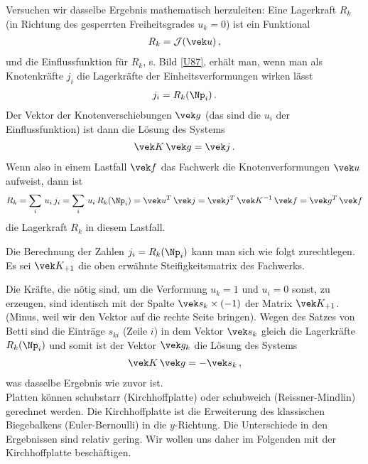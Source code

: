 {%
Versuchen wir dasselbe Ergebnis mathematisch herzuleiten: Eine Lagerkraft $R_k$ (in Richtung des gesperrten Freiheitsgrades $u_k = 0$) ist ein Funktional
\begin{align}
R_k = \mathcal{J}(\vek u)\,,
\end{align}
und die Einflussfunktion f\"{u}r $R_k$, s. Bild \ref{U87}, erh\"{a}lt man, wenn man als Knotenkr\"{a}fte $j_{i}$ die Lagerkr\"{a}fte der Einheitsverformungen wirken l\"{a}sst
\begin{align}
j_{i} = R_k(\Np_i)\,.
\end{align}
Der Vektor der Knotenverschiebungen $\vek g$ (das sind die $u_i$ der Einflussfunktion) ist dann die L\"{o}sung des Systems
\begin{align}
\vek K\,\vek g = \vek j\,.
\end{align}
Wenn also in einem Lastfall $\vek f$ das Fachwerk die Knotenverformungen $\vek u$ aufweist, dann ist
\begin{align}
R_k = \sum_i\,u_i\,j_{i} = \sum_i\,u_i\,R_k(\Np_i) = \vek u^T\,\vek j = \vek j^T\,\vek K^{-1}\,\vek f = \vek g^T\,\vek f
\end{align}
die Lagerkraft $R_k$ in diesem Lastfall.

Die Berechnung der Zahlen $j_i = R_k(\Np_i)$ kann man sich wie folgt zurechtlegen. Es sei $\vek K_{+1}$ die oben erw\"{a}hnte Steifigkeitsmatrix des Fachwerks.

Die Kr\"{a}fte, die n\"{o}tig sind, um die Verformung $u_k = 1$ und $u_i = 0$ sonst, zu erzeugen, sind identisch mit der Spalte $\vek s_k \times (-1)$ der Matrix $\vek K_{+1}$. (Minus, weil wir den Vektor auf die rechte Seite bringen). Wegen des Satzes von Betti sind die Eintr\"{a}ge $s_{ki}$ (Zeile $i$) in dem Vektor $\vek s_k$ gleich die Lagerkr\"{a}fte $R_k(\Np_i)$ und somit ist der Vektor $\vek g_k$ die L\"{o}sung des Systems
\begin{align}
\vek K\,\vek g = - \vek s_k\,,
\end{align}
was dasselbe Ergebnis wie zuvor ist.\\

Platten k\"{o}nnen schubstarr (Kirchhoffplatte) oder schubweich (Reissner-Mindlin) gerechnet werden. Die Kirchhoffplatte ist die Erweiterung des klassischen Biegebalkens (Euler-Bernoulli) in die $y$-Richtung. Die Unterschiede in den Ergebnissen sind relativ gering. Wir wollen uns daher im Folgenden mit der Kirchhoffplatte besch\"{a}ftigen.


}
